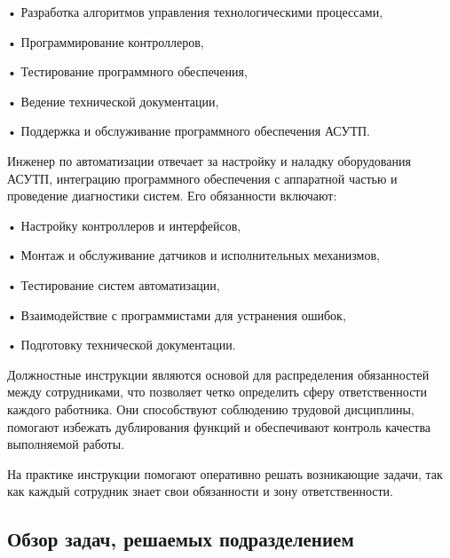 {	\par \redline • Разработка алгоритмов управления технологическими процессами,
	\par \redline • Программирование контроллеров,
	\par \redline • Тестирование программного обеспечения,
	\par \redline • Ведение технической документации,
	\par \redline • Поддержка и обслуживание программного обеспечения АСУТП.
	
	\par \redline Инженер по автоматизации отвечает за настройку и наладку оборудования АСУТП, интеграцию программного обеспечения с аппаратной частью и проведение диагностики систем. Его обязанности включают:
	
	\par \redline • Настройку контроллеров и интерфейсов,
	\par \redline • Монтаж и обслуживание датчиков и исполнительных механизмов,
	\par \redline • Тестирование систем автоматизации,
	\par \redline • Взаимодействие с программистами для устранения ошибок,
	\par \redline • Подготовку технической документации.
	
	\par \redline Должностные инструкции являются основой для распределения обязанностей между сотрудниками, что позволяет четко определить сферу ответственности каждого работника. Они способствуют соблюдению трудовой дисциплины, помогают избежать дублирования функций и обеспечивают контроль качества выполняемой работы.
	
	\par \redline На практике инструкции помогают оперативно решать возникающие задачи, так как каждый сотрудник знает свои обязанности и зону ответственности. 
	
	\par 
}


\subtitlespace

\subsection*{  
	\gostTitleFont
	 Обзор задач, решаемых подразделением
} 

\subtitlespace

